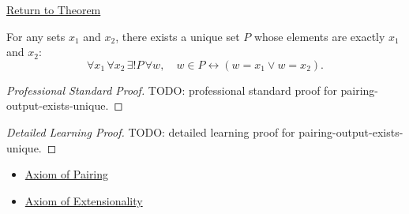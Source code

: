 \newpage
{}
\label{prf:pairing-output-exists-unique}

\begin{remark*}[Return]
\hyperref[thm:pairing-output-exists-unique]{Return to Theorem}
\end{remark*}

\begin{theorem*}
For any sets $x_1$ and $x_2$, there exists a unique set $P$ whose elements are
exactly $x_1$ and $x_2$:
\[
  \forall x_1\,\forall x_2\,\exists! P\,\forall w,\quad
  w\in P\leftrightarrow (w=x_1\vee w=x_2).
\]
\end{theorem*}

\begin{proof}[Professional Standard Proof]
\LRAProofBodyStart
TODO: professional standard proof for pairing-output-exists-unique.
\end{proof}

\begin{proof}[Detailed Learning Proof]
\LRAProofBodyStart
TODO: detailed learning proof for pairing-output-exists-unique.
\end{proof}

\begin{remark*}
\end{remark*}

\begin{dependencies}
\begin{itemize}
  \item \hyperref[ax:pairing]{Axiom of Pairing}
  \item \hyperref[ax:extensionality]{Axiom of Extensionality}
\end{itemize}
\end{dependencies}

\clearpage
